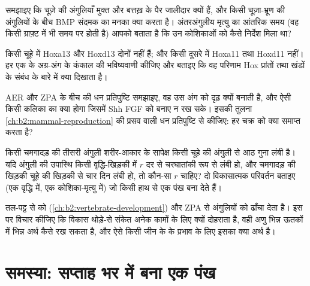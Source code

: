 \begin{exercise}[$\star\star$]\label{exo:b2:limb-organogenesis:8}
समझाइए कि चूज़े की अंगुलियाँ मुक्त और बत्तख़ के पैर जालीदार क्यों हैं,
और किसी चूज़ा-भ्रूण की अंगुलियों के बीच BMP संदमक का मनका क्या करता है।
अंतरअंगुलीय मृत्यु का आंतरिक समय (वह किसी ग्राफ़्ट में भी समय पर होती
है) आपको बताता है कि उन कोशिकाओं को कैसे निर्देश मिला था?
\end{exercise}

\begin{exercise}[$\star\star$]\label{exo:b2:limb-organogenesis:9}
किसी चूहे में Hoxa13 और Hoxd13 दोनों नहीं हैं; और किसी दूसरे में
Hoxa11 तथा Hoxd11 नहीं। हर एक के अग्र-अंग के कंकाल की भविष्यवाणी कीजिए
और बताइए कि वह परिणाम Hox प्रांतों तथा खंडों के संबंध के बारे में क्या दिखाता है।
\end{exercise}

\begin{exercise}[$\star\star\star$]\label{exo:b2:limb-organogenesis:10}
AER और ZPA के बीच की धन प्रतिपुष्टि समझाइए, वह उस अंग को दृढ़ क्यों
बनाती है, और ऐसी किसी कलिका का क्या होगा जिसमें Shh FGF को बनाए न रख
सके। इसकी तुलना \cref{ch:b2:mammal-reproduction} की प्रसव वाली धन
प्रतिपुष्टि से कीजिए: हर चक्र को क्या समाप्त करता है?
\end{exercise}

\begin{exercise}[$\star\star\star$]\label{exo:b2:limb-organogenesis:11}
किसी चमगादड़ की तीसरी अंगुली शरीर-आकार के सापेक्ष किसी चूहे की अंगुली से
आठ गुना लंबी है। यदि अंगुली की उपास्थि किसी वृद्धि-खिड़की में $r$ दर से
चरघातांकी रूप से लंबी हो, और चमगादड़ की खिड़की चूहे की खिड़की से चार
दिन लंबी हो, तो कौन-सा $r$ चाहिए? दो विकासात्मक परिवर्तन बताइए (एक
वृद्धि में, एक कोशिका-मृत्यु में) जो किसी हाथ से एक पंख बना देते हैं।
\end{exercise}

\begin{exercise}[$\star\star\star$]\label{exo:b2:limb-organogenesis:12}
 तल-पट्ट से  को
(\cref{ch:b2:vertebrate-development}) और ZPA से अंगुलियों को ढाँचा देता
है। इस पर विचार कीजिए कि विकास थोड़े-से संकेत अनेक कामों के लिए क्यों
दोहराता है, वही अणु भिन्न ऊतकों में भिन्न अर्थ कैसे रख सकता है, और
ऐसे किसी जीन के  के प्रभाव के लिए इसका क्या अर्थ है।
\end{exercise}

\section{समस्या: सप्ताह भर में बना एक पंख}

